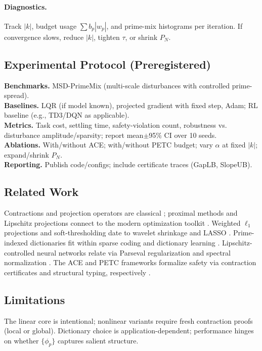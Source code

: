 \documentclass[11pt]{article}
\theoremstyle{plain}
\theoremstyle{definition}
\theoremstyle{remark}
\begin{document}
\paragraph{Diagnostics.} Track $|k|$, budget usage $\sum b_p|w_p|$, and prime-mix histograms per iteration. If convergence slows, reduce $|k|$, tighten $\tau$, or shrink $P_N$.

\subsection{Experimental Protocol (Preregistered)}
\textbf{Benchmarks.} MSD-PrimeMix (multi-scale disturbances with controlled prime-spread).\\
\textbf{Baselines.} LQR (if model known), projected gradient with fixed step, Adam; RL baseline (e.g., TD3/DQN as applicable).\\
\textbf{Metrics.} Task cost, settling time, safety-violation count, robustness vs. disturbance amplitude/sparsity; report mean$\pm$95\% CI over 10 seeds.\\
\textbf{Ablations.} With/without ACE; with/without PETC budget; vary $\alpha$ at fixed $|k|$; expand/shrink $P_N$.\\
\textbf{Reporting.} Publish code/configs; include certificate traces (GapLB, SlopeUB).

\subsection{Related Work}
Contractions and projection operators are classical \cite{BauschkeCombettes2017}; proximal methods and Lipschitz projections connect to the modern optimization toolkit \cite{ParikhBoyd2014}. Weighted $\ell_1$ projections and soft-thresholding date to wavelet shrinkage \cite{DonohoJohnstone1994} and LASSO \cite{Tibshirani1996}. Prime-indexed dictionaries fit within sparse coding and dictionary learning \cite{MallatZhang1993,OlshausenField1996,Mairal2010}. Lipschitz-controlled neural networks relate via Parseval regularization \cite{Cisse2017Parseval} and spectral normalization \cite{Miyato2018SN}. The ACE and PETC frameworks formalize safety via contraction certificates and structural typing, respectively \cite{VanOsdolACE,VanGelderPETC}.

\subsection{Limitations}
The linear core is intentional; nonlinear variants require fresh contraction proofs (local or global). Dictionary choice is application-dependent; performance hinges on whether $\{\phi_p\}$ captures salient structure.
\end{document}
